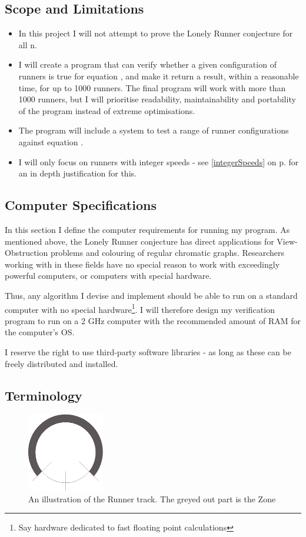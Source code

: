 \subsection{Scope and Limitations}
\begin{itemize}
\item In this project I will not attempt to prove the Lonely Runner conjecture for all n. 
\item I will create a program that can verify whether a given configuration of runners is true for equation , and make it return a result, within a reasonable time, for up to 1000 runners. The final program will work with more than 1000 runners, but I will prioritise readability, maintainability and portability of the program instead of extreme optimisations. 
\item The program will include a system to test a range of runner configurations against equation .
\item I will only focus on runners with integer speeds - see \ref{integerSpeeds} on p. \pageref{integerSpeeds} for an in depth justification for this.
\end{itemize}

\subsection{Computer Specifications}
\label{specs}
In this section I define the computer requirements for running my program. As mentioned above, the Lonely Runner conjecture has direct applications for View-Obstruction problems and colouring of regular chromatic graphs. Researchers working with in these fields have no special reason to work with exceedingly powerful computers, or computers with special hardware.
 
Thus, any algorithm I devise and implement should be able to run on a standard computer with no special hardware\footnote{Say hardware dedicated to fast floating point calculations}. I will therefore design my verification program to run on a 2 GHz computer with the recommended amount of RAM for the computer's OS. 

I reserve the right to use third-party software libraries - as long as these can be freely distributed and installed.

\subsection{Terminology}
\label{Termonolgy}
\begin{figure}[H]
  \centering
  \includegraphics[width=0.3\textwidth, angle=90]{./images/circleZoneEPS}
  \caption{\label{circleZoneImg}An illustration of the Runner track. The greyed out part is the Zone}
\end{figure}

